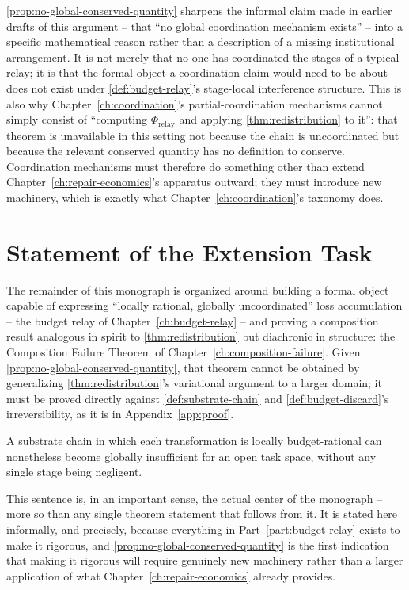 \cref{prop:no-global-conserved-quantity} sharpens the informal claim made
in earlier drafts of this argument -- that ``no global coordination
mechanism exists'' -- into a specific mathematical reason rather than a
description of a missing institutional arrangement. It is not merely that
no one has coordinated the stages of a typical relay; it is that the
formal object a coordination claim would need to be about does not exist
under \cref{def:budget-relay}'s stage-local interference structure. This
is also why Chapter~\ref{ch:coordination}'s partial-coordination
mechanisms cannot simply consist of ``computing $\Phi_{\mathrm{relay}}$
and applying \cref{thm:redistribution} to it'': that theorem is
unavailable in this setting not because the chain is uncoordinated but
because the relevant conserved quantity has no definition to conserve.
Coordination mechanisms must therefore do something other than extend
Chapter~\ref{ch:repair-economics}'s apparatus outward; they must
introduce new machinery, which is exactly what
Chapter~\ref{ch:coordination}'s taxonomy does.

\section{Statement of the Extension Task}

The remainder of this monograph is organized around building a formal
object capable of expressing ``locally rational, globally uncoordinated''
loss accumulation -- the budget relay of Chapter~\ref{ch:budget-relay} --
and proving a composition result analogous in spirit to
\cref{thm:redistribution} but diachronic in structure: the Composition
Failure Theorem of Chapter~\ref{ch:composition-failure}. Given
\cref{prop:no-global-conserved-quantity}, that theorem cannot be obtained
by generalizing \cref{thm:redistribution}'s variational argument to a
larger domain; it must be proved directly against
\cref{def:substrate-chain} and \cref{def:budget-discard}'s irreversibility,
as it is in Appendix~\ref{app:proof}.

\begin{principle}
\label{principle:global-insufficiency-restated}
A substrate chain in which each transformation is locally
budget-rational can nonetheless become globally insufficient for an open
task space, without any single stage being negligent.
\end{principle}

This sentence is, in an important sense, the actual center of the
monograph -- more so than any single theorem statement that follows from
it. It is stated here informally, and precisely, because everything in
Part~\ref{part:budget-relay} exists to make it rigorous, and
\cref{prop:no-global-conserved-quantity} is the first indication that
making it rigorous will require genuinely new machinery rather than a
larger application of what Chapter~\ref{ch:repair-economics} already
provides.
